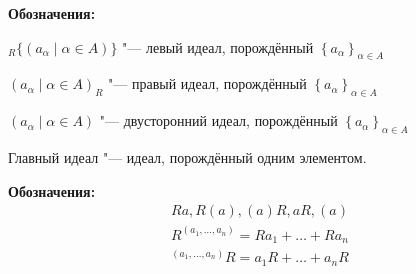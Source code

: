 \textbf{Обозначения:}

${}_R \{(a_\alpha \mid \alpha \in A)\}$ "--- левый идеал, порождённый $\left\{ a_\alpha \right\}_{\alpha \in A}$

$(a_\alpha \mid \alpha \in A)_R$ "--- правый идеал, порождённый $\left\{ a_\alpha \right\}_{\alpha \in A}$

$(a_\alpha \mid \alpha \in A)$ "--- двусторонний идеал, порождённый $\left\{ a_\alpha \right\}_{\alpha \in A}$

\begin{Def}
	Главный идеал "--- идеал, порождённый одним элементом.

	\textbf{Обозначения:} 
	\begin{gather*}
		Ra, R(a), (a)R, aR, (a) \\
		R^{(a_1, \dots, a_n)} = Ra_1 + \dots + Ra_n \\
		{}^{(a_1, \dots, a_n)}R = a_1R + \dots + a_nR
	\end{gather*}
\end{Def}